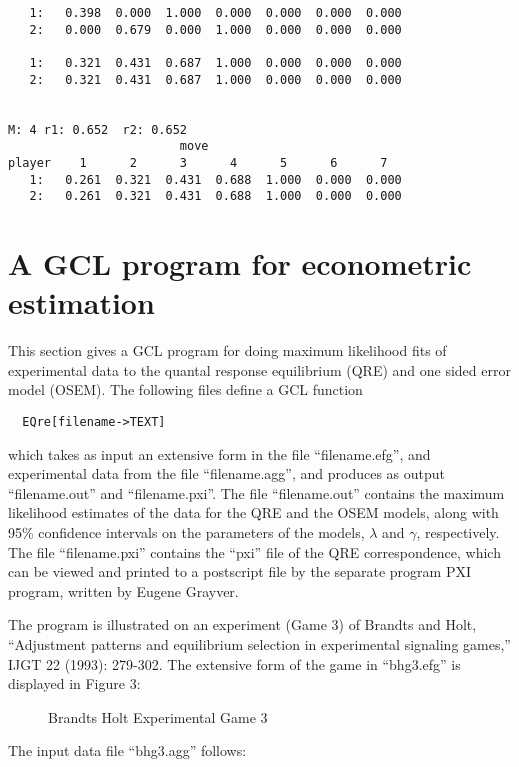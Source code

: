 {\begin{verbatim}
   1:   0.398  0.000  1.000  0.000  0.000  0.000  0.000  
   2:   0.000  0.679  0.000  1.000  0.000  0.000  0.000  

   1:   0.321  0.431  0.687  1.000  0.000  0.000  0.000  
   2:   0.321  0.431  0.687  1.000  0.000  0.000  0.000  


M: 4 r1: 0.652  r2: 0.652
                        move
player    1      2      3      4      5      6      7  
   1:   0.261  0.321  0.431  0.688  1.000  0.000  0.000  
   2:   0.261  0.321  0.431  0.688  1.000  0.000  0.000  
\end{verbatim}
}

\newpage
\section{A GCL program for econometric estimation}  

This section gives a GCL program for doing maximum likelihood fits of
experimental data to the quantal response equilibrium (QRE) and one
sided error model (OSEM).  The following files define a GCL function 

\begin{verbatim}
  EQre[filename->TEXT] 
\end{verbatim}

\noindent
which takes as input an extensive form in the file ``filename.efg'',
and experimental data from the file ``filename.agg'', and produces as
output ``filename.out'' and ``filename.pxi''.  The file
``filename.out'' contains the maximum likelihood estimates of the data
for the QRE and the OSEM models, along with 95\% confidence intervals
on the parameters of the models, $\lambda$ and $\gamma$, respectively.
The file ``filename.pxi'' contains the ``pxi'' file of the QRE
correspondence, which can be viewed and printed to a postscript file
by the separate program PXI program, written by Eugene Grayver.  

The program is illustrated on an experiment (Game 3) of Brandts and
Holt, ``Adjustment patterns and equilibrium selection in experimental
signaling games,'' IJGT 22 (1993): 279-302.  The extensive form of the
game in ``bhg3.efg'' is displayed in Figure 3:

\begin{figure}[htp]
\centerline{}
\caption{Brandts Holt Experimental Game 3}
\end{figure}

\noindent
The input data file ``bhg3.agg'' follows:

